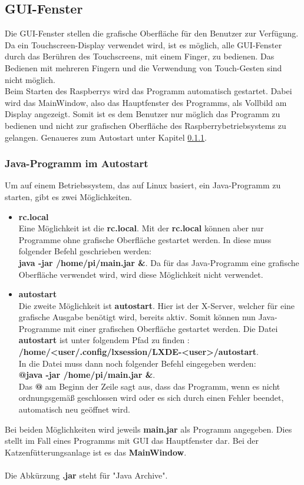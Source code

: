 \subsection{GUI-Fenster}
Die \ac{GUI}-Fenster stellen die grafische Oberfläche für den Benutzer zur Verfügung. Da ein Touchscreen-Display verwendet wird, ist es möglich, alle \ac{GUI}-Fenster durch das Berühren des Touchscreens, mit einem Finger, zu bedienen. Das Bedienen mit mehreren Fingern und die Verwendung von Touch-Gesten sind nicht möglich.
\\ Beim Starten des Raspberrys wird das Programm automatisch gestartet. Dabei wird das MainWindow, also das Hauptfenster des Programms, als Vollbild am Display angezeigt. Somit ist es dem Benutzer nur möglich das Programm zu bedienen und nicht zur grafischen Oberfläche des Raspberrybetriebsystems zu gelangen. Genaueres zum Autostart unter Kapitel \ref{subsubsec:Autostart}.

\subsubsection{Java-Programm im Autostart}\label{subsubsec:Autostart}
Um auf einem Betriebssystem, das auf Linux basiert, ein Java-Programm zu starten, gibt es zwei Möglichkeiten.
\begin{itemize}
\item[1] \textbf{rc.local}
\\ Eine Möglichkeit ist die \textbf{rc.local}. Mit der \textbf{rc.local} können aber nur Programme ohne grafische Oberfläche gestartet werden. In diese muss folgender Befehl geschrieben werden: 
\\ \textbf{java -jar /home/pi/main.jar \&}.
Da für das Java-Programm eine grafische Oberfläche verwendet wird, wird diese Möglichkeit nicht verwendet.
\item[2] \textbf{autostart}
\\ Die zweite Möglichkeit ist \textbf{autostart}. Hier ist der X-Server, welcher für eine grafische Ausgabe benötigt wird, bereits aktiv. Somit können nun Java-Programme mit einer grafischen Oberfläche gestartet werden. Die Datei \textbf{autostart} ist unter folgendem Pfad zu finden : 
\\ \textbf{/home/<user/.config/lxsession/LXDE-<user>/autostart}. 
\\ In die Datei muss dann noch folgender Befehl eingegeben werden: 
\\ \textbf{@java -jar /home/pi/main.jar \&}.
\\Das \textbf{@} am Beginn der Zeile sagt aus, dass das Programm, wenn es nicht ordnungsgemäß geschlossen wird oder es sich durch einen Fehler beendet, automatisch neu geöffnet wird.
\end{itemize} 
Bei beiden Möglichkeiten wird jeweils \textbf{main.jar} als Programm angegeben. Dies stellt im Fall eines Programms mit \ac{GUI} das Hauptfenster dar. Bei der Katzenfütterungsanlage ist es das \textbf{MainWindow}.
\\ \\ Die Abkürzung \textbf{.jar} steht für "Java Archive".

